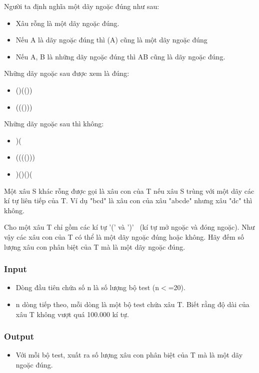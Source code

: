 



   Người ta định nghĩa một dãy ngoặc đúng như sau:  
\begin{itemize}
	\item     Xâu rỗng là một dãy ngoặc đúng.   
	\item     Nếu A là dãy ngoặc đúng thì (A) cũng là một dãy ngoặc đúng   
	\item     Nếu A, B là những dãy ngoặc đúng thì AB cũng là dãy ngoặc đúng.   
\end{itemize}

   Những dãy ngoặc sau được xem là đúng:  
\begin{itemize}
	\item     ()(())   
	\item     ((()))   
\end{itemize}

   Những dãy ngoặc sau thì không:  
\begin{itemize}
	\item     )(   
	\item     (((()))   
	\item     )()()(   
\end{itemize}

   Một xâu S khác rỗng được gọi là xâu con của T nếu xâu S trùng với một dãy các kí tự liên tiếp của T. Ví dụ "bcd" là xâu con của xâu "abcde" nhưng xâu "dc" thì không.  

   Cho một xâu T chỉ gồm các kí tự '(' và ')'  (kí tự mở ngoặc và đóng ngoặc). Như vậy các xâu con của T có thể là một dãy ngoặc đúng hoặc không. Hãy đếm số lượng xâu con phân biệt của T mà là một dãy ngoặc đúng.  

\subsubsection{   Input  }
\begin{itemize}
	\item     Dòng đầu tiên chứa số n là số lượng bộ test (n$<$=20).   
	\item     n dòng tiếp theo, mỗi dòng là một bộ test chứa xâu T. Biết rằng độ dài của xâu T không vượt quá 100.000 kí tự.   
\end{itemize}

\subsubsection{   Output  }
\begin{itemize}
	\item     Với mỗi bộ test, xuất ra số lượng xâu con phân biệt của T mà là một dãy ngoặc đúng.   
\end{itemize}

